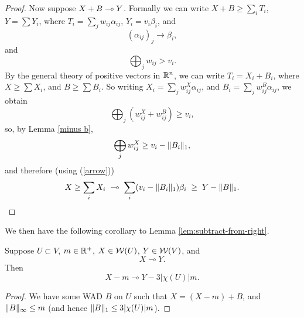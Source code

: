 \begin{proof}
Now suppose $X + B \multimap Y$.
Formally we can write
$X + B \ge \sum_i T_i$, $Y = \sum Y_i$,
where
$T_i = \sum_j w_{ij} \alpha_{ij}$,
$Y_i = v_i \beta_i$,
and
\begin{equation} \label{arrow}
(\alpha_{ij})_j \rightarrow \beta_i,
\end{equation}
and
$$\bigoplus_j w_{ij} > v_i.$$
By the general theory of positive vectors in ${\Bbb R}^n$,
we can write
$T_i = X_i + B_i$,
where $X \ge \sum X_i$,
and $B \ge \sum B_i$.
So writing
$X_i = \sum_j w^X_{ij} \alpha_{ij}$,
and
$B_i = \sum_j w^B_{ij} \alpha_{ij}$,
we obtain
$$\bigoplus_j (w^X_{ij} + w^B_{ij}) \ge v_i,$$
so, by Lemma \ref{minus b},
$$\bigoplus_j w^X_{ij} \ge v_i - \Vert B_i \Vert_1,$$
and therefore (using (\ref{arrow}))
$$
X \ge \sum_i X_i \;\multimap\; \sum_i (v_i - \Vert B_i \Vert_1)\beta_i \;\ge\; Y - \Vert B \Vert_1. \qedhere
$$
\end{proof}
We then have the following corollary to Lemma \ref{lem:subtract-from-right}.
\begin{cor} \label{cor:sub-sub}
Suppose $U \subset V$, $m \in {\Bbb R}^+$, $X \in {\mathcal W}(U)$,  $Y \in {\mathcal W}(V)$,
and 
$$
X  \multimap Y.
$$
Then 
$$
X -m \multimap Y- 3 |\chi(U)| m.
$$
\end{cor}
\begin{proof}
We have some WAD $B$ on $U$ such that $X = (X - m) + B$, and $\Vert B \Vert_\infty \le m$ (and hence $\Vert B \Vert_1 \le 3 |\chi(U)| m$).   
\end{proof}



